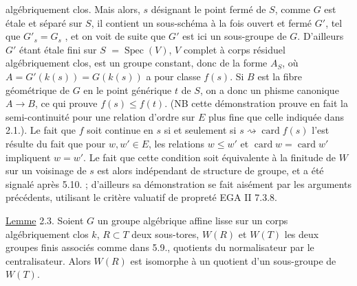 
algébriquement clos. Mais alors, $s$ désignant le point fermé de $S$, comme $G$ est étale et séparé sur $S$, il contient un sous-schéma à la fois ouvert et fermé $G'$,  tel que $G'_s=G_s$ , et on voit de suite que $G'$ est ici un sous-groupe de $G$.  D'ailleurs $G'$  étant étale fini sur $S$  $=\operatorname{Spec}(V)$, $V$ complet à corps résiduel algébriquement clos, est un groupe constant, donc de la forme $A_S$, où $A=G'(k(s))=G(k(s))$ a pour classe $f(s)$.  Si $B$ est la fibre géométrique de $G$ en le point générique $t$ de $S$, on a donc un phisme canonique $A\longrightarrow B$, ce qui prouve $f(s)\leq f(t)$. (NB cette démonstration prouve en fait la semi-continuité pour une relation d'ordre sur $E$ plus fine que celle indiquée dans 2.1.). Le fait que $f$ soit continue en $s$ si et seulement si $s\rightsquigarrow\operatorname{card}f(s)$ l'est résulte du fait que pour $w,w'\in E$, les relations  $w\leq w'$ et $\operatorname{card}w=\operatorname{card}w'$ impliquent $w=w'$. Le fait que cette condition soit équivalente à  la finitude de $W$ sur un voisinage de $s$ est alors indépendant de structure de groupe, et a été signalé après  5.10. ; d'ailleurs sa démonstration  se fait aisément par les arguments précédents,  utilisant le critère valuatif de propreté EGA II 7.3.8.

\uline{Lemme} 2.3. Soient $G$ un groupe algébrique affine lisse sur un corps algébriquement clos $k$, $R\subset T$ deux sous-tores, $W(R)$ et $W(T)$ les deux groupes finis associés comme dans  5.9., quotients du normalisateur par le centralisateur. Alors $W(R)$ est isomorphe à un quotient d'un sous-groupe de $W(T)$.


